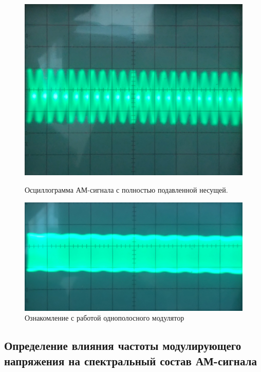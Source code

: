 \begin{figure}[H]
\begin{minipage}[h]{0.49\linewidth}
	\centering
	\includegraphics[width=\linewidth]{img/img4}
	\caption{Осциллограмма АМ-сигнала с полностью подавленной несущей.}
	\label{fig:rec3}
\end{minipage}
\hfill
\begin{minipage}[h]{0.49\linewidth}
	\centering
	\includegraphics[width=\linewidth]{img/img3}
	\caption{Ознакомление с работой однополосного модулятор }
	\label{fig:rec4}
\end{minipage}
\end{figure}




\subsection{Определение влияния частоты модулирующего напряжения на спектральный состав АМ-сигнала}

